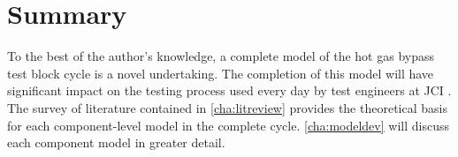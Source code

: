 \section{Summary}
To the best of the author's knowledge, a complete model of the hot gas bypass
test block cycle is a novel undertaking.
The completion of this model will have significant impact on the testing process
used every day by test engineers at JCI \parencite{sommer2013}.
The survey of literature contained in \cref{cha:litreview} provides
the theoretical basis for each component-level model in the complete cycle.
\cref{cha:modeldev} will discuss each component model in greater detail.
